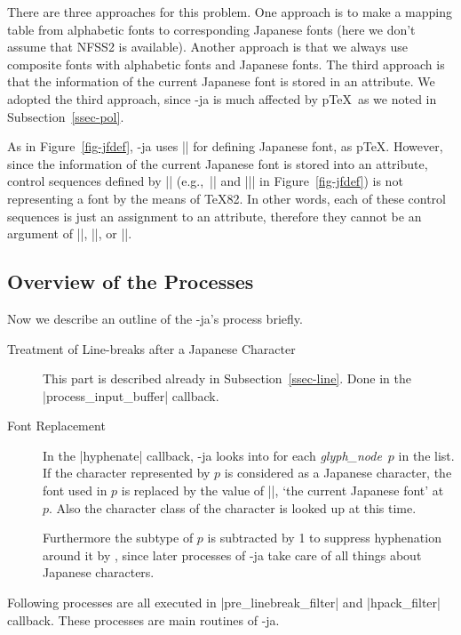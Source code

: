 \documentclass{ajt}
\begin{document}
There are three approaches for this problem. One approach is to make a
mapping table from alphabetic fonts to corresponding Japanese fonts
(here we don't assume that NFSS2 is available).  Another approach is
that we always use composite fonts with alphabetic fonts and Japanese
fonts. The third approach is that the information of the current
Japanese font is stored in an attribute. We adopted the third approach,
since \LuaTeX-ja is much affected by p\TeX\ as we noted in
Subsection~\ref{ssec-pol}.

As in Figure~\ref{fig-jfdef}, \LuaTeX-ja uses |\jfont| for defining
Japanese font, as p\TeX.  However, since the information of the current
Japanese font is stored into an attribute, control sequences defined by
|\jfont| (e.g.,~|\foo| and |\bar| in Figure~\ref{fig-jfdef}) is
not representing a font by the means of \TeX82. In other words, each of
these control sequences is just an assignment to an attribute, therefore
they cannot be an argument of |\the|, |\fontname|, or |\textfont|.

\subsection{Overview of the Processes}
Now we describe an outline of the \LuaTeX-ja's process briefly.
\begin{description}
\item[Treatment of Line-breaks after a Japanese Character] This part is
	   described already in Subsection~\ref{ssec-line}. Done in the
	   |process_input_buffer| callback.
\item[Font Replacement] In the |hyphenate| callback, \LuaTeX-ja looks
	   into for each \textit{glyph\_node}~$p$ in the list. If the
	   character represented by $p$ is considered as a Japanese
	   character, the font used in $p$ is replaced by the value of
	   |\ltj@curjfnt|, `the current Japanese font' at~$p$. Also the
	   character class of the character is looked up at this time.

Furthermore the subtype of $p$ is subtracted by 1 to suppress
	   hyphenation around it by \LuaTeX, since later processes of
	   \LuaTeX-ja take care of all things about Japanese characters.
\end{description}
%
Following processes are all executed in |pre_linebreak_filter| and
|hpack_filter| callback. These processes are main routines of \LuaTeX-ja.
\end{document}
